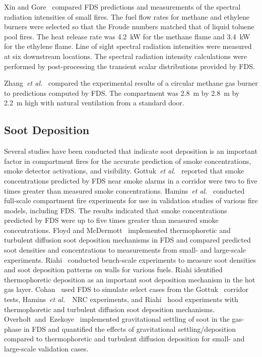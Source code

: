 Xin   and  Gore~\cite{Xin:JSS2003}   compared   FDS  predictions   and measurements  of the  spectral radiation  intensities of  small fires. The
fuel flow rates for  methane and ethylene burners were selected so that the  Froude numbers  matched that of  liquid toluene  pool fires. The heat
release rate was 4.2~kW  for the methane flame and 3.4~kW for the ethylene flame.  Line of sight spectral radiation intensities were measured  at
six  downstream  locations.    The  spectral  radiation intensity calculations were performed by post-processing the transient scalar  distributions
provided  by FDS.

Zhang~{\em et al.}~\cite{Zhang:1} compared the experimental results of a  circular methane  gas burner  to predictions  computed by  FDS. The
compartment was 2.8~m by 2.8~m  by 2.2~m high with natural ventilation from a  standard door.




\subsection{Soot Deposition}

Several studies have been conducted that indicate soot deposition is an important factor in compartment fires
for the accurate prediction of smoke concentrations, smoke detector activations, and visibility.
Gottuk~{\em et al.}~\cite{Gottuk:IAFSS2008} reported that smoke concentrations predicted by FDS near smoke alarms in a
corridor were two to five times greater than measured smoke concentrations. Hamins~{\em et al.}~\cite{Hamins:SP1013-1}
conducted full-scale compartment fire experiments for use in validation studies of various fire models, including FDS.
The results indicated that smoke concentrations predicted by FDS were up to five times greater than measured
smoke concentrations. Floyd and McDermott~\cite{Floyd:Interflam2010} implemented thermophoretic and turbulent diffusion soot
deposition mechanisms in FDS and compared predicted soot densities and concentrations to measurements from small- and large-scale
experiments. Riahi~\cite{Riahi:2011} conducted bench-scale experiments to measure soot densities and soot
deposition patterns on walls for various fuels. Riahi identified thermophoretic deposition as an important soot deposition
mechanism in the hot gas layer. Cohan~\cite{Cohan:Masters} used FDS to simulate select cases from the
Gottuk~\cite{Gottuk:IAFSS2008} corridor tests, Hamins~{\em et al.}~\cite{Hamins:SP1013-1}~NRC experiments, and
Riahi~\cite{Riahi:2011} hood experiments with thermophoretic and turbulent diffusion soot deposition mechanisms.
Overholt~and~Ezekoye~\cite{Overholt:1} implemented gravitational settling of soot in the gas-phase in FDS and quantified
the effects of gravitational settling/deposition compared to thermophoretic and turbulent diffusion deposition for small- and
large-scale validation cases.




